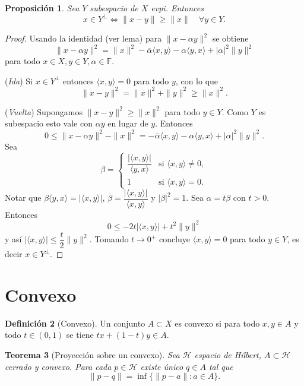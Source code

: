 \documentclass[11pt]{article}
\theoremstyle{definition}
\newtheorem{definition}{Definición}[section]
\theoremstyle{plain}
\newtheorem{proposition}[definition]{Proposición}
\newtheorem{theorem}[definition]{Teorema}
\begin{document}
\begin{proposition}
Sea $Y$ subespacio de $X$ evpi. Entonces
\[x\in Y^{\perp}\iff\|x-y\|\ge\|x\|\quad\forall y\in Y.\]
\end{proposition}
\begin{proof}
Usando la identidad (ver lema) para $\|x-\alpha y\|^2$ se obtiene
\[\|x-\alpha y\|^2=\|x\|^2-\overline{\alpha}\langle x,y\rangle-\alpha\langle y,x\rangle+|\alpha|^2\|y\|^2\]
para todo $x\in X,y\in Y,\alpha\in\mathbb{F}$.

(\emph{Ida}) Si $x\in Y^{\perp}$ entonces $\langle x,y\rangle=0$ para todo $y$, con lo que
\[\|x-y\|^2=\|x\|^2+\|y\|^2\ge\|x\|^2.\]

(\emph{Vuelta}) Supongamos $\|x-y\|^2\ge\|x\|^2$ para todo $y\in Y$. Como $Y$ es subespacio esto vale con $\alpha y$ en lugar de $y$. Entonces
\[0\le\|x-\alpha y\|^2-\|x\|^2=-\overline{\alpha}\langle x,y\rangle-\alpha\langle y,x\rangle+|\alpha|^2\|y\|^2.\]
Sea
\[\beta=\begin{cases}\dfrac{|\langle x,y\rangle|}{\langle y,x\rangle}&\text{si }\langle x,y\rangle\ne0,\\1&\text{si }\langle x,y\rangle=0.\end{cases}\]
Notar que $\beta\langle y,x\rangle=|\langle x,y\rangle|$, $\overline{\beta}=\dfrac{|\langle x,y\rangle|}{\langle x,y\rangle}$ y $|\beta|^2=1$. Sea $\alpha=t\beta$ con $t>0$. Entonces
\[0\le -2t|\langle x,y\rangle|+t^2\|y\|^2\]
y así $|\langle x,y\rangle|\le\dfrac{t}{2}\|y\|^2$. Tomando $t\to0^+$ concluye $\langle x,y\rangle=0$ para todo $y\in Y$, es decir $x\in Y^{\perp}$.
\end{proof}

\section*{Convexo}

\begin{definition}[Convexo]
Un conjunto $A\subset X$ es convexo si para todo $x,y\in A$ y todo $t\in(0,1)$ se tiene $tx+(1-t)y\in A$.
\end{definition}

\begin{theorem}[Proyección sobre un convexo]
Sea $\mathcal{H}$ espacio de Hilbert, $A\subset\mathcal{H}$ cerrado y convexo. Para cada $p\in\mathcal{H}$ existe único $q\in A$ tal que
\[\|p-q\|=\inf\{\|p-a\|:a\in A\}.
\]
\end{theorem}
\end{document}

